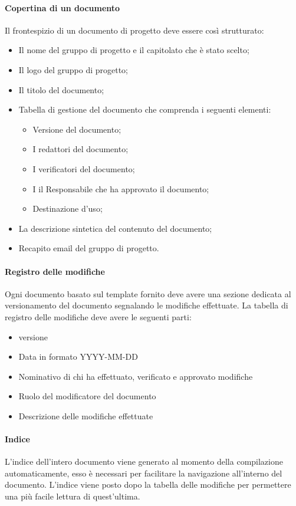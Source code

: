   \paragraph{Copertina di un documento}
  Il frontespizio di un documento di progetto deve essere così strutturato:
  \begin{itemize}
    \item Il nome del gruppo di progetto e il capitolato che è stato scelto;
    \item Il logo del gruppo di progetto;
    \item Il titolo del documento;
    \item Tabella di gestione del documento che comprenda i seguenti elementi:
    \begin{itemize}
      \item Versione del documento;
      \item I redattori del documento;
      \item I verificatori del documento;
      \item I il Responsabile che ha approvato il documento;
      \item Destinazione d'uso;
    \end{itemize}
    \item La descrizione sintetica del contenuto del documento;
    \item Recapito email del gruppo di progetto.
  \end{itemize}
  \paragraph{Registro delle modifiche}
  Ogni documento basato sul template fornito deve avere una sezione dedicata al versionamento
  del documento segnalando le modifiche effettuate.
  La tabella di registro delle modifiche deve avere le seguenti parti:
  \begin{itemize}
    \item versione
    \item Data in formato YYYY-MM-DD
    \item Nominativo di chi ha effettuato, verificato e approvato modifiche
    \item Ruolo del modificatore del documento
    \item Descrizione delle modifiche effettuate
  \end{itemize}
  \paragraph{Indice}
  L'indice dell'intero documento viene generato al momento della compilazione
  automaticamente, esso è necessari per facilitare la navigazione all'interno del
  documento.
  L'indice viene posto dopo la tabella delle modifiche per permettere una più facile
  lettura di quest'ultima.
